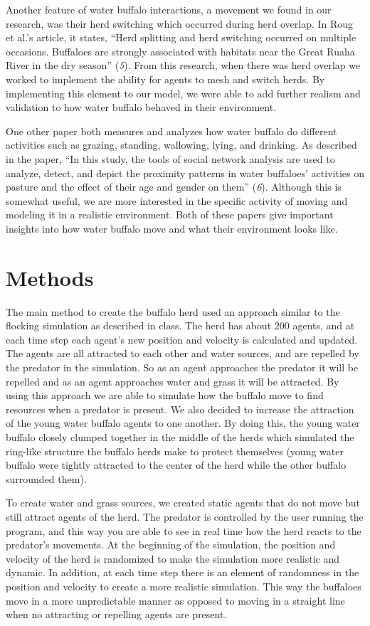 \documentclass[12pt]{article}
\begin{document}
Another feature of water buffalo interactions, a movement we found in our research, was their herd switching which occurred during herd overlap. In Roug et al.’s article, it states, “Herd splitting and herd switching occurred on multiple occasions. Buffaloes are strongly associated with habitats near the Great Ruaha River in the dry season” ({\it 5}). From this research, when there was herd overlap we worked to implement the ability for agents to mesh and switch herds. By implementing this element to our model, we were able to add further realism and validation to how water buffalo behaved in their environment.

One other paper both measures and analyzes how water buffalo do different activities such as grazing, standing, wallowing, lying, and drinking. As described in the paper, “In this study, the tools of social network analysis are used to analyze, detect, and depict the proximity patterns in water buffaloes' activities on pasture and the effect of their age and gender on them” ({\it 6}). Although this is somewhat useful, we are more interested in the specific activity of moving and modeling it in a realistic environment. Both of these papers give important insights into how water buffalo move and what their environment looks like.

\section*{Methods}

The main method to create the buffalo herd used an approach similar to the flocking simulation as described in class. The herd has about 200 agents, and at each time step each agent's new position and velocity is calculated and updated. The agents are all attracted to each other and water sources, and are repelled by the predator in the simulation. So as an agent approaches the predator it will be repelled and as an agent approaches water and grass it will be attracted. By using this approach we are able to simulate how the buffalo move to find resources when a predator is present. We also decided to increase the attraction of the young water buffalo agents to one another. By doing this, the young water buffalo closely clumped together in the middle of the herds which simulated the ring-like structure the buffalo herds make to protect themselves (young water buffalo were tightly attracted to the center of the herd while the other buffalo surrounded them).

To create water and grass sources, we created static agents that do not move but still attract agents of the herd. The predator is controlled by the user running the program, and this way you are able to see in real time how the herd reacts to the predator's movements.
At the beginning of the simulation, the position and velocity of the herd is randomized to make the simulation more realistic and dynamic. In addition, at each time step there is an element of randomness in the position and velocity to create a more realistic simulation. This way the buffaloes move in a more unpredictable manner as opposed to moving in a straight line when no attracting or repelling agents are present.
\end{document}
